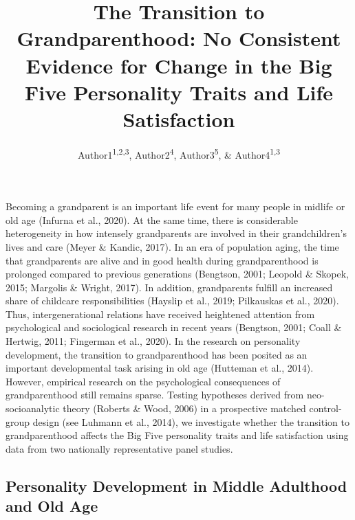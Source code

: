\documentclass[
  english,
  man,floatsintext]{apa7}
\title{The Transition to Grandparenthood: No Consistent Evidence for Change in the Big Five Personality Traits and Life Satisfaction}
\author{Author1\textsuperscript{1,2,3}, Author2\textsuperscript{4}, Author3\textsuperscript{5}, \& Author4\textsuperscript{1,3}}
\date{}
\affiliation{\vspace{0.5cm}\textsuperscript{1} Institution1\\\textsuperscript{2} Institution2\\\textsuperscript{3} Institution3\\\textsuperscript{4} Institution4\\\textsuperscript{5} Institution5}
\begin{document}
\maketitle

Becoming a grandparent is an important life event for many people in midlife or old age (Infurna et al., 2020). At the same time, there is considerable heterogeneity in how intensely grandparents are involved in their grandchildren's lives and care (Meyer \& Kandic, 2017). In an era of population aging, the time that grandparents are alive and in good health during grandparenthood is prolonged compared to previous generations (Bengtson, 2001; Leopold \& Skopek, 2015; Margolis \& Wright, 2017). In addition, grandparents fulfill an increased share of childcare responsibilities (Hayslip et al., 2019; Pilkauskas et al., 2020). Thus, intergenerational relations have received heightened attention from psychological and sociological research in recent years (Bengtson, 2001; Coall \& Hertwig, 2011; Fingerman et al., 2020). In the research on personality development, the transition to grandparenthood has been posited as an important developmental task arising in old age (Hutteman et al., 2014). However, empirical research on the psychological consequences of grandparenthood still remains sparse. Testing hypotheses derived from neo-socioanalytic theory (Roberts \& Wood, 2006) in a prospective matched control-group design (see Luhmann et al., 2014), we investigate whether the transition to grandparenthood affects the Big Five personality traits and life satisfaction using data from two nationally representative panel studies.

\hypertarget{personality-development-in-middle-adulthood-and-old-age}{%
\subsection{Personality Development in Middle Adulthood and Old Age}\label{personality-development-in-middle-adulthood-and-old-age}}
\end{document}
